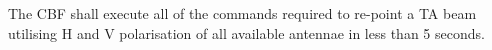 The CBF shall execute all of the commands required to re-point a TA beam
utilising H and V polarisation of all available antennae in less than 5
seconds.
